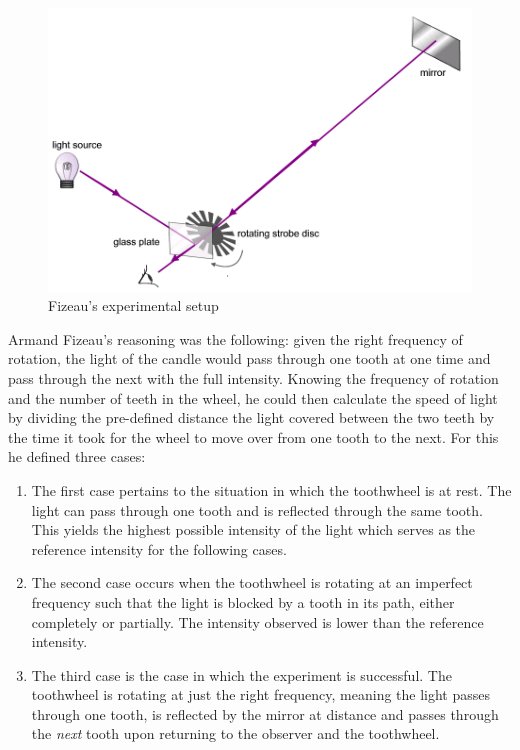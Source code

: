 \begin{figure}[h!]
	\centering
	\includegraphics[scale=0.7]{img/fizeau}
	\caption{Fizeau's experimental setup}
\end{figure}

Armand Fizeau's reasoning was the following: given the right frequency of rotation, the light of the candle would pass through one tooth at one time and pass through the next with the full intensity. Knowing the frequency of rotation and the number of teeth in the wheel, he could then calculate the speed of light by dividing the pre-defined distance the light covered between the two teeth by the time it took for the wheel to move over from one tooth to the next. For this he defined three cases:

\begin{enumerate}
	\item The first case pertains to the situation in which the toothwheel is at rest. The light can pass through one tooth and is reflected through the same tooth. This yields the highest possible intensity of the light which serves as the reference intensity for the following cases.


	\item The second case occurs when the toothwheel is rotating at an imperfect frequency such that the light is blocked by a tooth in its path, either completely or partially. The intensity observed is lower than the reference intensity.

	\item The third case is the case in which the experiment is successful. The toothwheel is rotating at just the right frequency, meaning the light passes through one tooth, is reflected by the mirror at distance and passes through the \emph{next} tooth upon returning to the observer and the toothwheel.
\end{enumerate}

